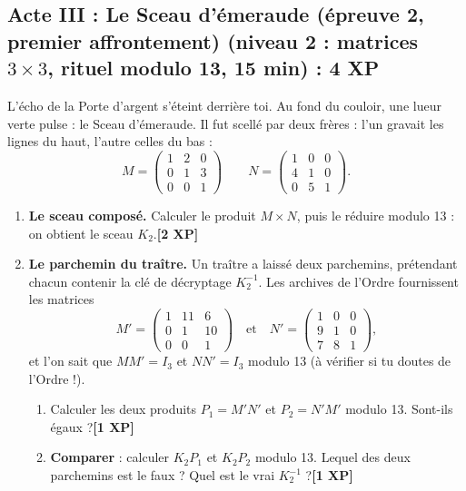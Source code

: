 \documentclass[11pt,a4paper]{article}
\newcommand{\Epx}[1]{\textcolor{or}{\textbf{[#1 XP]}}}
\begin{document}
\subsection*{\textcolor{emeraude}{Acte III : Le Sceau d'émeraude (épreuve 2, premier affrontement)} \normalsize\textcolor{emeraude}{(niveau 2 : matrices $3\times 3$, rituel modulo 13, 15 min)} : 4 XP}

L'écho de la Porte d'argent s'éteint derrière toi. Au fond du couloir,
une lueur verte pulse : le Sceau d'émeraude. Il fut scellé par deux
frères : l'un gravait les lignes du haut, l'autre celles du bas :
\[
M=\begin{pmatrix}1&2&0\\0&1&3\\0&0&1\end{pmatrix}\qquad
N=\begin{pmatrix}1&0&0\\4&1&0\\0&5&1\end{pmatrix}.
\]

\begin{enumerate}[label=\textbf{B.\arabic*.},leftmargin=10mm]
  \item \textbf{Le sceau composé.} Calculer le produit $M\times N$, puis le
        réduire modulo 13 : on obtient le sceau $K_2$.\Epx{2}
  \item \textbf{Le parchemin du traître.} Un traître a laissé deux parchemins,
        prétendant chacun contenir la clé de décryptage $K_2^{-1}$.
        Les archives de l'Ordre fournissent les matrices
        \[
        M'=\begin{pmatrix}1&11&6\\0&1&10\\0&0&1\end{pmatrix}\quad\text{et}\quad
        N'=\begin{pmatrix}1&0&0\\9&1&0\\7&8&1\end{pmatrix},
        \]
        et l'on sait que $M M' = I_3$ et $N N' = I_3$ modulo 13
        (à vérifier si tu doutes de l'Ordre !).
        \begin{enumerate}[label=\alph*)]
          \item Calculer les deux produits $P_1 = M'N'$ et $P_2 = N'M'$
                modulo 13. Sont-ils égaux ?\Epx{1}
          \item \textbf{Comparer} : calculer $K_2 P_1$ et $K_2 P_2$ modulo 13.
                Lequel des deux parchemins est le faux ? Quel est le vrai
                $K_2^{-1}$ ?\Epx{1}
        \end{enumerate}
\end{enumerate}
\end{document}
